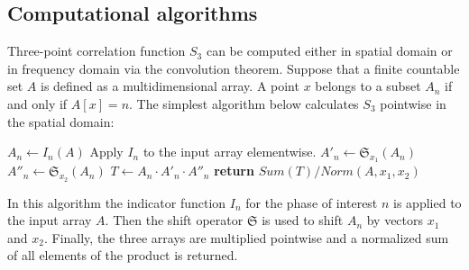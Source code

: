 \documentclass[reprint,amsmath,amssymb,aps,pre,showkeys,showpacs]{revtex4-1}
\begin{document}
\subsection{Computational algorithms}
Three-point correlation function $S_3$ can be computed either in spatial domain
or in frequency domain via the convolution theorem. Suppose that a finite
countable set $A$ is defined as a multidimensional array. A point $x$ belongs to
a subset $A_n$ if and only if $A[x] = n$. The simplest algorithm below
calculates $S_3$ pointwise in the spatial domain:
\begin{algorithmic}[1]
  \State $A_n \gets I_n (A)$
  \Comment Apply $I_n$ to the input array elementwise.
  \State $A'_n \gets \mathfrak{S}_{x_1}(A_n)$
  \State $A''_n \gets \mathfrak{S}_{x_2}(A_n)$
  \State $T \gets A_n \cdot A'_n \cdot A''_n$
  \State \textbf{return} $Sum(T) / Norm(A, x_1, x_2)$
  \EndProcedure
\end{algorithmic}
In this algorithm the indicator function $I_n$ for the phase of interest $n$ is
applied to the input array $A$. Then the shift operator $\mathfrak{S}$ is used
to shift $A_n$ by vectors $x_1$ and $x_2$. Finally, the three arrays are
multiplied pointwise and a normalized sum of all elements of the product is
returned.
\end{document}
